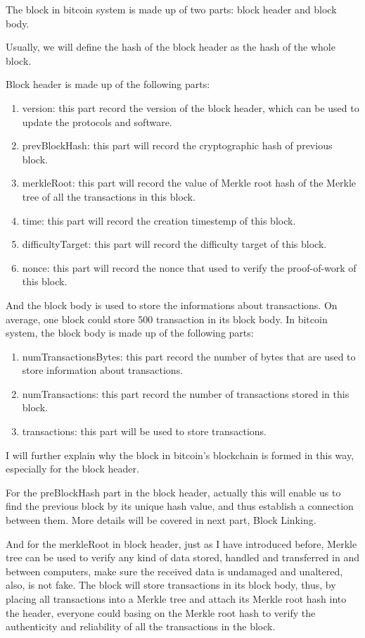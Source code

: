 \documentclass[12pt,a4paper]{article}
\begin{document}
The block in bitcoin system is made up of two parts: block header and block body.

Usually, we will define the hash of the block header as the hash of the whole block.

Block header is made up of the following parts:
\begin{enumerate}
    \item 
    version: this part record the version of the block header, which can be used to update the protocols and software.
    \item
    prevBlockHash: this part will record the cryptographic hash of previous block.
    \item
    merkleRoot: this part will record the value of Merkle root hash of the Merkle tree of all the transactions in this block.
    \item
    time: this part will record the creation timestemp of this block.
    \item
    difficultyTarget: this part will record the difficulty target of this block.
    \item
    nonce: this part will record the nonce that used to verify the proof-of-work of this block.
\end{enumerate}

And the block body is used to store the informations about transactions. On average, one block could store 500 transaction in its block body. In bitcoin system, the block body is made up of the following parts:

\begin{enumerate}
    \item 
    numTransactionsBytes: this part record the number of bytes that are used to store information about transactions.
    \item
    numTransactions: this part record the number of transactions stored in this block.
    \item
    transactions: this part will be used to store transactions.
\end{enumerate}

I will further explain why the block in bitcoin's blockchain is formed in this way, especially for the block header.

For the preBlockHash part in the block header, actually this will enable us to find the previous block by its unique hash value, and thus establish a connection between them. More details will be covered in next part, Block Linking.

And for the merkleRoot in block header, just as I have introduced before, Merkle tree can be used to verify any kind of data stored, handled and transferred in and between computers, make sure the received data is undamaged and unaltered, also, is not fake. The block will store transactions in its block body, thus, by placing all transactions into a Merkle tree and attach its Merkle root hash into the header, everyone could basing on the Merkle root hash to verify the authenticity and reliability of all the transactions in the block.
\end{document}
